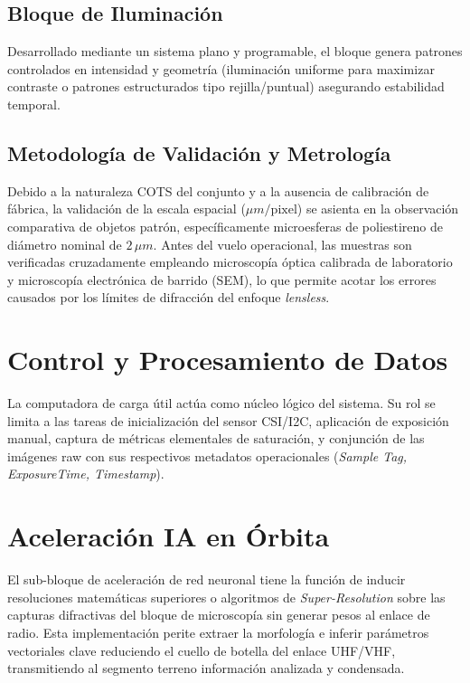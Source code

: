 \subsection{Bloque de Iluminación}
Desarrollado mediante un sistema plano y programable, el bloque genera patrones controlados en intensidad y geometría (iluminación uniforme para maximizar contraste o patrones estructurados tipo rejilla/puntual) asegurando estabilidad temporal.

\subsection{Metodología de Validación y Metrología}
Debido a la naturaleza COTS del conjunto y a la ausencia de calibración de fábrica, la validación de la escala espacial ($\mu m/\text{pixel}$) se asienta en la observación comparativa de objetos patrón, específicamente microesferas de poliestireno de diámetro nominal de $2\,\mu m$. Antes del vuelo operacional, las muestras son verificadas cruzadamente empleando microscopía óptica calibrada de laboratorio y microscopía electrónica de barrido (SEM), lo que permite acotar los errores causados por los límites de difracción del enfoque \textit{lensless}.

\section{Control y Procesamiento de Datos}
La computadora de carga útil actúa como núcleo lógico del sistema. Su rol se limita a las tareas de inicialización del sensor CSI/I2C, aplicación de exposición manual, captura de métricas elementales de saturación, y conjunción de las imágenes raw con sus respectivos metadatos operacionales (\textit{Sample Tag, ExposureTime, Timestamp}). 

\section{Aceleración IA en Órbita}
El sub-bloque de aceleración de red neuronal tiene la función de inducir resoluciones matemáticas superiores o algoritmos de \textit{Super-Resolution} sobre las capturas difractivas del bloque de microscopía sin generar pesos al enlace de radio. Esta implementación perite extraer la morfología e inferir parámetros vectoriales clave reduciendo el cuello de botella del enlace UHF/VHF, transmitiendo al segmento terreno información analizada y condensada.
